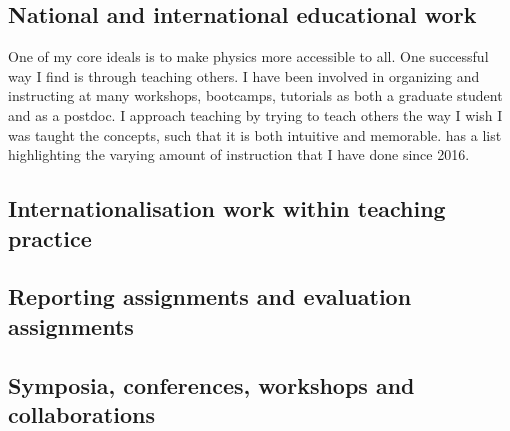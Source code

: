 \subsection{National and international educational work \noneyet}\label{ssec:national-and-international-educational-work-noneyet}

One of my core ideals is to make physics more accessible to all. One successful way I find is through teaching others. I have been involved in organizing and instructing at many workshops, bootcamps, tutorials as both a graduate student and as a postdoc. I approach teaching by trying to teach others the way I wish I was taught the concepts, such that it is both intuitive and memorable.  has a list highlighting the varying amount of instruction that I have done since 2016.

\subsection{Internationalisation work within teaching practice \noneyet}\label{ssec:internationalisation-work-within-teaching-practice-noneyet}
\subsection{Reporting assignments and evaluation assignments \noneyet}\label{ssec:reporting-assignments-and-evaluation-assignments-noneyet}
\subsection{Symposia, conferences, workshops and collaborations}\label{ssec:symposia-conferences-workshops-and-collaborations}

